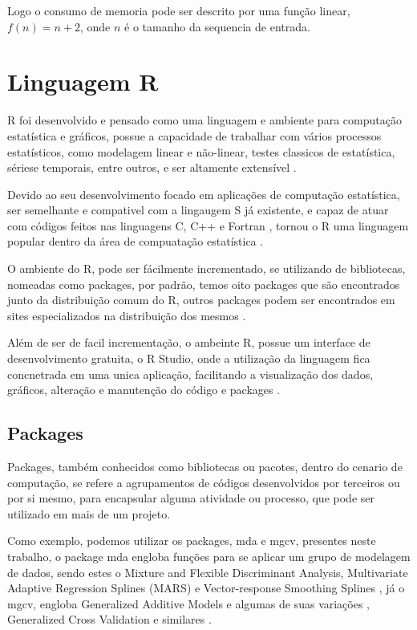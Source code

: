 \documentclass[
	12pt,				%
	openright,			%
	oneside,			%
	a4paper,			%
	english,			%
	brazil				%
	]{abntex2}
\begin{document}
Logo o consumo de memoria pode ser descrito por uma função linear, $f(n) = n + 2$, onde $n$ é o tamanho da sequencia de
entrada.

\section{Linguagem R}

R foi desenvolvido e pensado como uma linguagem e ambiente para computação estatística e gráficos, possue a capacidade
de trabalhar com vários processos estatísticos, como modelagem linear e não-linear, testes classicos de estatística,
sériese temporais, entre outros, e ser altamente extensível \cite{ling_r}.

Devido ao seu desenvolvimento focado em aplicações de computação estatística, ser semelhante e compativel 
com a lingaugem S já existente, e capaz de atuar com códigos feitos nas linguagens C, C++ e Fortran \cite{ling_r},
tornou o R uma linguagem popular dentro da área de compuatação estatística \cite{linguagem_r}.

O ambiente do R, pode ser fácilmente incrementado, se utilizando de bibliotecas, nomeadas como packages, por padrão,
temos oito packages que são encontrados junto da distribuição comum do R, outros packages podem ser encontrados em sites
especializados na distribuição dos mesmos \cite{ling_r}.

Além de ser de facil incrementação, o ambeinte R, possue um interface de desenvolvimento gratuita, o R Studio, onde
a utilização da linguagem fica concnetrada em uma unica aplicação, facilitando a visualização dos dados, gráficos, alteração
e manutenção do código e packages \cite{rstudio}.

\subsection{Packages}

Packages, também conhecidos como bibliotecas ou pacotes, dentro do cenario de computação, se refere a agrupamentos de códigos
desenvolvidos por terceiros ou por si mesmo, para encapsular alguma atividade ou processo, que pode ser utilizado em mais
de um projeto.

Como exemplo, podemos utilizar os packages, mda e mgcv, presentes neste trabalho, o package mda engloba funções para se aplicar
um grupo de modelagem de dados, sendo estes o Mixture and Flexible Discriminant Analysis, Multivariate Adaptive Regression 
Splines (MARS) e Vector-response Smoothing Splines \cite{mda}, já o mgcv, engloba Generalized Additive Models e algumas de suas variações
, Generalized Cross Validation e similares \cite{mgcv}.
\end{document}
